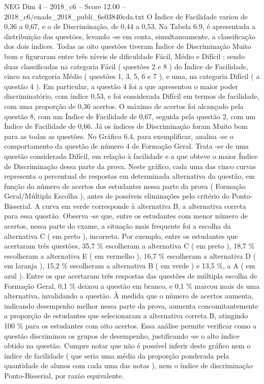 \begin{textsample}{NEG Dim 4 – 2018\_c6 – Score 12.00 – 2018\_c6/enade\_2018\_publi\_6e03840cda.txt}
O Índice de Facilidade variou de 0,36 a 0,67, e o de Discriminação, de 0,44 a 0,53.
Na Tabela 6.9, é apresentada a distribuição das questões, levando -se em conta, simultaneamente, a classificação dos dois índices.
Todas as oito questões tiveram Índice de Discriminação Muito bom e figuraram entre três níveis de dificuldade Fácil, Médio e Difícil ; sendo duas classificadas na categoria Fácil ( questões 2 e 8 ) do Índice de Facilidade, cinco na categoria Médio ( questões 1, 3, 5, 6 e 7 ), e uma, na categoria Difícil ( a questão 4 ).
Em particular, a questão 4 foi a que apresentou o maior poder discriminatório, com índice 0,53, e foi considerada Difícil em termos de facilidade, com uma proporção de 0,36 acertos.
O máximo de acertos foi alcançado pela questão 8, com um Índice de Facilidade de 0,67, seguida pela questão 2, com um Índice de Facilidade de 0,66.
Já os índices de Discriminação foram Muito bom para as todas as questões.
No Gráfico 6.4, para exemplificar, analisa -se o comportamento da questão de número 4 de Formação Geral.
Trata -se de uma questão considerada Difícil, em relação à facilidade e a que obteve o maior Índice de Discriminação dessa parte da prova.
Neste gráfico, cada uma das cinco curvas representa o percentual de respostas em determinada alternativa da questão, em função do número de acertos dos estudantes nessa parte da prova ( Formação Geral/Múltipla Escolha ), antes de possíveis eliminações pelo critério do Ponto-Bisserial.
A curva em verde corresponde à alternativa B, a alternativa correta para essa questão.
Observa -se que, entre os estudantes com menor número de acertos, nessa parte do exame, a situação mais frequente foi a escolha da alternativa C ( em preto ), incorreta.
Por exemplo, entre os estudantes que acertaram três questões, 35,7 \% escolheram a alternativa C ( em preto ), 18,7 \% escolheram a alternativa E ( em vermelho ), 16,7 \% escolheram a alternativa D ( em laranja ), 15,2 \% escolheram a alternativa B ( em verde ) e 13,5 \%, a A ( em azul ).
Entre os que acertaram três respostas das questões de múltipla escolha de Formação Geral, 0,1 \% deixou a questão em branco, e 0,1 \% marcou mais de uma alternativa, invalidando a questão.
À medida que o número de acertos aumenta, indicando desempenho melhor nessa parte da prova, aumenta concomitantemente a proporção de estudantes que selecionaram a alternativa correta B, atingindo 100 \% para os estudantes com oito acertos.
Essa análise permite verificar como a questão discriminou os grupos de desempenho, justificando -se o alto índice obtido na questão.
Cumpre notar que não é possível inferir deste gráfico nem o índice de facilidade ( que seria uma média da proporção ponderada pela quantidade de alunos com cada uma das notas ), nem o índice de discriminação Ponto-Bisserial, por razão equivalente.

\end{textsample}
